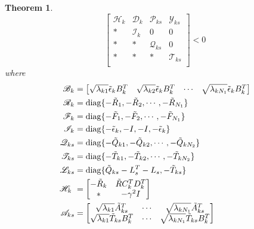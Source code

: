 \documentclass[conference]{IEEEtran}
\newtheorem{theorem}{Theorem}
\begin{document}
\begin{theorem}
	\begin{equation}\label{T3C3}
		\begin{bmatrix}
			\mathscr{H}_{k}&\mathscr{D}_{k}&\mathscr{P}_{ks}&\mathscr{Y}_{ks}\\
			*&\mathscr{I}_{k}&0&0\\
			*&*&\mathscr{Q}_{ks}&0\\
			*&*&*&\mathscr{T}_{ks}\\
		\end{bmatrix} <0
	\end{equation}
	where 
	\begin{equation}\notag
		\begin{split}
			\mathscr{B}_{k}&= \begin{bmatrix}
				\sqrt{\lambda_{k1}}\tilde{\epsilon}_{k}B^{T}_{k}&\sqrt{\lambda_{k2}}\tilde{\epsilon}_{k}B^{T}_{k}&\cdots&\sqrt{\lambda_{kN_{1}}}\tilde{\epsilon}_{k}B^{T}_{k}
			\end{bmatrix}\\
			\mathscr{R}_{k}&= \mathrm{diag}\{-\tilde{R}_{1}, -\tilde{R}_{2}, \cdots, -\tilde{R}_{N_{1}} \} \\
			\mathscr{F}_{k}&= \mathrm{diag}\{-\tilde{F}_{1}, -\tilde{F}_{2}, \cdots, -\tilde{F}_{N_{1}} \} \\	
			\mathscr{I}_{k} &= \mathrm{diag}\{-\tilde{\epsilon}_{k}, -I, -I, -\tilde{\epsilon}_{k} \}\\	
			\mathscr{Q}_{ks}&= \mathrm{diag}\{-\tilde{Q}_{k1}, -\tilde{Q}_{k2}, \cdots, -\tilde{Q}_{kN_{2}} \}\\
			\mathscr{T}_{ks}&= \mathrm{diag}\{-\tilde{T}_{k1}, -\tilde{T}_{k2}, \cdots, -\tilde{T}_{kN_{2}} \}\\
			\mathscr{L}_{ks}&= \mathrm{diag}\{\tilde{Q}_{ks}-L^{T}_{s}-L_{s},  -\tilde{T}_{ks} \}\\
			\mathscr{H}_{k}\ &= \begin{bmatrix}
				-\tilde{R}_{k} & \tilde{R}C^{T}_{k}D^{T}_{k}\\
				*& -\gamma^{2}I
			\end{bmatrix} \\
			\mathscr{A}_{ks} &=\begin{bmatrix}
				\sqrt{\lambda_{k1}} \tilde{A}^{T}_{ks}& \cdots&\sqrt{\lambda_{kN_{1}}} \tilde{A}^{T}_{ks}\\
				\sqrt{\lambda_{k1}}\tilde{T}_{ks}B^{T}_{k} &\cdots&\sqrt{\lambda_{kN_{1}}} \tilde{T}_{ks}B^{T}_{k}\\

\end{bmatrix}
\end{split}
\end{equation}
\end{theorem}
\end{document}
